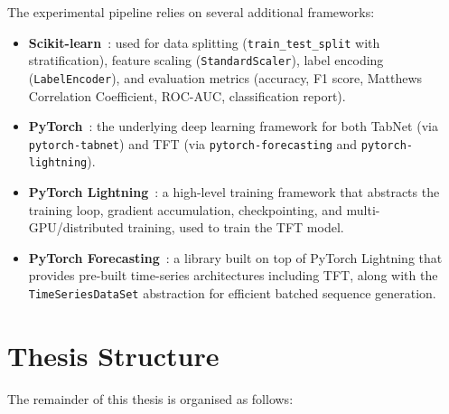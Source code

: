 The experimental pipeline relies on several additional frameworks:

\begin{itemize}
    \item \textbf{Scikit-learn}~\cite{pedregosa2011scikit}: used for data
          splitting (\texttt{train\_test\_split} with stratification), feature
          scaling (\texttt{StandardScaler}), label encoding
          (\texttt{LabelEncoder}), and evaluation metrics (accuracy, F1 score,
          Matthews Correlation Coefficient, ROC-AUC, classification report).
    \item \textbf{PyTorch}~\cite{paszke2019pytorch}: the underlying deep
          learning framework for both TabNet (via \texttt{pytorch-tabnet}) and
          TFT (via \texttt{pytorch-forecasting} and
          \texttt{pytorch-lightning}).
    \item \textbf{PyTorch Lightning}~\cite{falcon2019pytorch}: a high-level
          training framework that abstracts the training loop, gradient
          accumulation, checkpointing, and multi-GPU/distributed training,
          used to train the TFT model.
    \item \textbf{PyTorch Forecasting}~\cite{beitner2020pytorchforecasting}:
          a library built on top of PyTorch Lightning that provides pre-built
          time-series architectures including TFT, along with the
          \texttt{TimeSeriesDataSet} abstraction for efficient batched
          sequence generation.
\end{itemize}

\section{Thesis Structure}
\label{sec:thesis-structure}

The remainder of this thesis is organised as follows:

